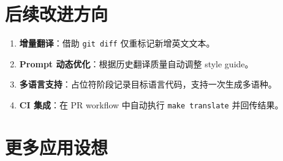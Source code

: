 \documentclass[12pt]{article}
\begin{document}
\section{后续改进方向}

\begin{enumerate}
  \item \textbf{增量翻译}：借助 \texttt{git diff} 仅重标记新增英文文本。
  \item \textbf{Prompt 动态优化}：根据历史翻译质量自动调整 style guide。
  \item \textbf{多语言支持}：占位符阶段记录目标语言代码，支持一次生成多语种。
  \item \textbf{CI 集成}：在 PR workflow 中自动执行 \lstinline|make translate| 并回传结果。
\end{enumerate}

\section{更多应用设想}
\end{document}
